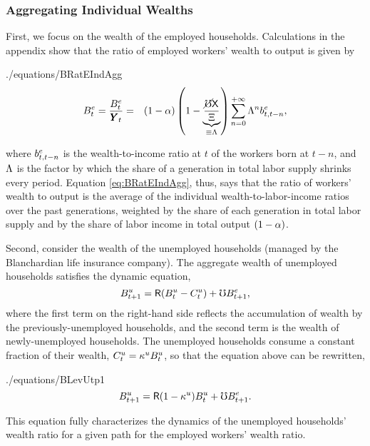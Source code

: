 \documentclass[titlepage,abstract,letterpaper]{econtex}
\renewcommand{\GDPLev}{\ensuremath{\pmb{Y}}}
\begin{document}
\subsubsection{Aggregating Individual Wealths}

First, we focus on the wealth of the employed households. Calculations
in the appendix show that the ratio of employed workers' wealth to
output is given by
\begin{verbatimwrite}{./equations/BRatEIndAgg}
\begin{eqnarray}
\BRatE_{t} = \frac{\BLevE_t}{\GDPLev_t} & = & (1-\kapShare) \left(1-\underbrace{\frac{\erate\XperGro}{\EmpGro}}_{\equiv \LGro}\right) \sum_{n=0}^{+\infty}\LGro^{n} \bRatE_{t,t-n}, \label{eq:LGro} \label{eq:BRatEIndAgg}
\end{eqnarray}
\end{verbatimwrite}

where $b^{e}_{t,t-n}$ is the wealth-to-income ratio at $t$ of the workers born at $t-n$, and $\Lambda$ is the factor by which the share of a generation in total labor supply shrinks every period. Equation \eqref{eq:BRatEIndAgg}, thus, says that the ratio of workers' wealth to output is the average of the individual wealth-to-labor-income ratios over the past generations, weighted by the share of each generation in total labor supply and by the share of labor income in total output $(1-\alpha)$.

Second, consider the wealth of the unemployed households (managed by the Blanchardian life insurance company). The aggregate wealth of unemployed households satisfies the dynamic equation,
\begin{equation*}
B^{u}_{t+1}= \mathsf{R} (B^{u}_{t} -C^{u}_t)+ \mho B^{e}_{t+1},
\end{equation*}
where the first term on the right-hand side reflects the accumulation of wealth by the previously-unemployed households, and the second term is the wealth of newly-unemployed households. The unemployed households consume a constant fraction of their wealth, $C^{u}_t= \kappa^{u} B^{u}_{t}$, so that the equation above can be rewritten,
\begin{verbatimwrite}{./equations/BLevUtp1}
\begin{equation}
B^{u}_{t+1}= \mathsf{R} (1-\kappa^{u}) B^{u}_{t}+ \mho B^{e}_{t+1}.
\label{eq:BLevUtp1}
\end{equation}
\end{verbatimwrite}

This equation fully characterizes the dynamics of the unemployed households' wealth ratio for a given path for the employed workers' wealth ratio.
\end{document}
